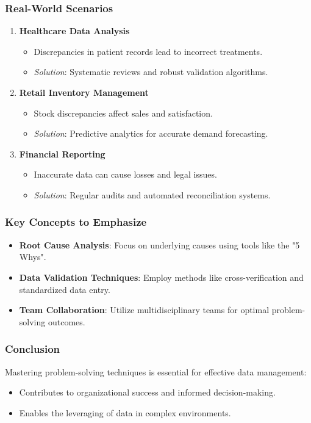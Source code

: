 \documentclass[aspectratio=169]{beamer}
\begin{document}
\begin{frame}[fragile]
    \frametitle{Real-World Scenarios}
    \begin{enumerate}
        \item \textbf{Healthcare Data Analysis}
            \begin{itemize}
                \item Discrepancies in patient records lead to incorrect treatments.
                \item \textit{Solution}: Systematic reviews and robust validation algorithms.
            \end{itemize}
        \item \textbf{Retail Inventory Management}
            \begin{itemize}
                \item Stock discrepancies affect sales and satisfaction.
                \item \textit{Solution}: Predictive analytics for accurate demand forecasting.
            \end{itemize}
        \item \textbf{Financial Reporting}
            \begin{itemize}
                \item Inaccurate data can cause losses and legal issues.
                \item \textit{Solution}: Regular audits and automated reconciliation systems.
            \end{itemize}
    \end{enumerate}
\end{frame}

\begin{frame}[fragile]
    \frametitle{Key Concepts to Emphasize}
    \begin{itemize}
        \item \textbf{Root Cause Analysis}: Focus on underlying causes using tools like the "5 Whys".
        \item \textbf{Data Validation Techniques}: Employ methods like cross-verification and standardized data entry.
        \item \textbf{Team Collaboration}: Utilize multidisciplinary teams for optimal problem-solving outcomes.
    \end{itemize}
\end{frame}

\begin{frame}[fragile]
    \frametitle{Conclusion}
    Mastering problem-solving techniques is essential for effective data management:
    \begin{itemize}
        \item Contributes to organizational success and informed decision-making.
        \item Enables the leveraging of data in complex environments.
    \end{itemize}
\end{frame}
\end{document}
